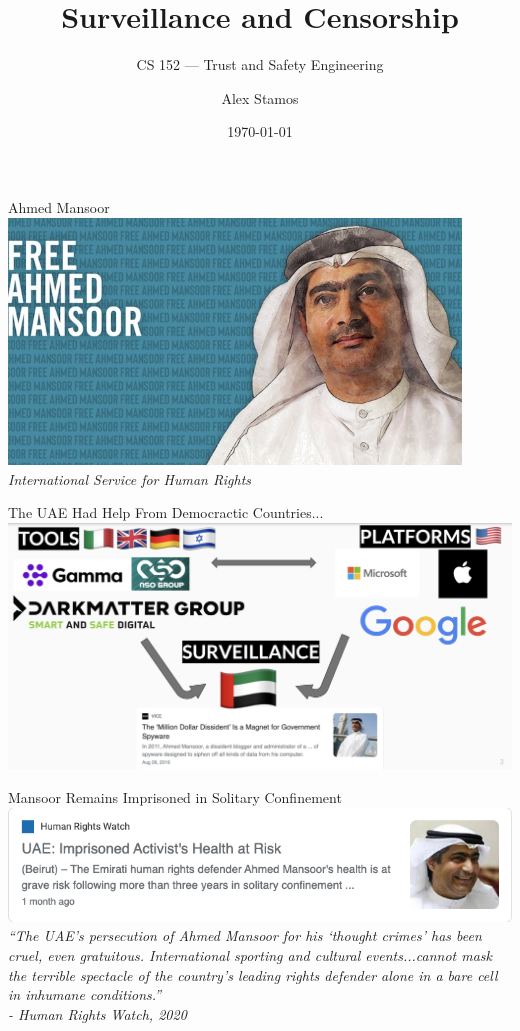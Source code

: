 \documentclass[nobackground,dvipsnames,table,aspectratio=169]{beamer}
\title{Surveillance and Censorship}
\subtitle{CS 152 --- Trust and Safety Engineering}
\author[A. Stamos]{Alex Stamos}
\institute[Stanford University]{Stanford Cyber Policy Center}
\date[2022]{\today}
\begin{document}
\begin{frame}
    \titlepage
\end{frame}

\begin{frame}{Ahmed Mansoor}
    \includegraphics[width=0.9\textwidth]{free-ahmed-mansoor}
    \small
    \textit{International Service for Human Rights}
\end{frame}

\begin{frame}{The UAE Had Help From Democractic Countries...}
    \includegraphics[width=\textwidth]{uae-help}
\end{frame}

\begin{frame}{Mansoor Remains Imprisoned in Solitary Confinement}
    \centering
    \includegraphics[width=\textwidth]{mansoor-health-at-risk}
    \textit{“The UAE’s persecution of Ahmed Mansoor for his ‘thought crimes’ has been cruel, even gratuitous. International sporting and cultural events...cannot mask the terrible spectacle of the country’s leading rights defender alone in a bare cell in inhumane conditions.”}\\
    \small{\textit{- Human Rights Watch, 2020}}
\end{frame}
\end{document}
